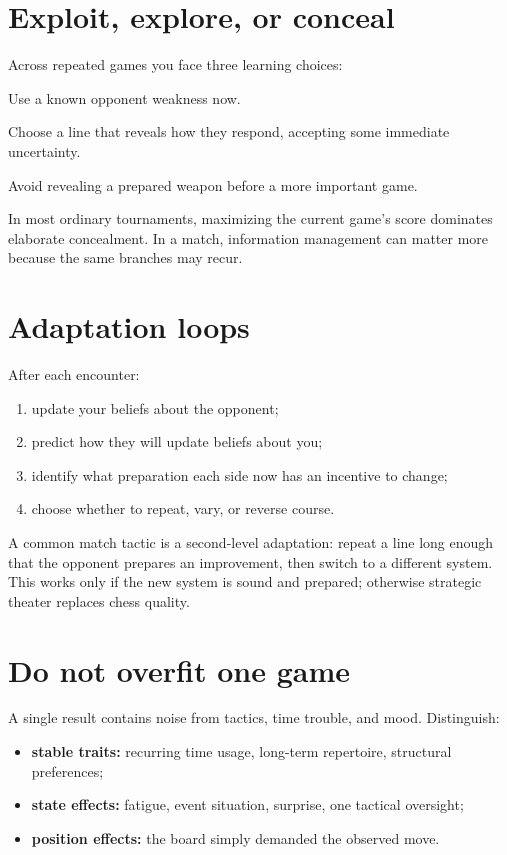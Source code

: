 \section{Exploit, explore, or conceal}
Across repeated games you face three learning choices:

\begin{description}[style=nextline,leftmargin=2.4em,labelsep=.5em]
\item[Exploit.] Use a known opponent weakness now.
\item[Explore.] Choose a line that reveals how they respond, accepting some immediate uncertainty.
\item[Conceal.] Avoid revealing a prepared weapon before a more important game.
\end{description}

In most ordinary tournaments, maximizing the current game's score dominates elaborate concealment. In a match, information management can matter more because the same branches may recur.

\section{Adaptation loops}
After each encounter:

\begin{enumerate}[leftmargin=1.4em]
\item update your beliefs about the opponent;
\item predict how they will update beliefs about you;
\item identify what preparation each side now has an incentive to change;
\item choose whether to repeat, vary, or reverse course.
\end{enumerate}

A common match tactic is a second-level adaptation: repeat a line long enough that the opponent prepares an improvement, then switch to a different system. This works only if the new system is sound and prepared; otherwise strategic theater replaces chess quality.

\section{Do not overfit one game}
A single result contains noise from tactics, time trouble, and mood. Distinguish:

\begin{itemize}[leftmargin=1.4em]
\item \textbf{stable traits:} recurring time usage, long-term repertoire, structural preferences;
\item \textbf{state effects:} fatigue, event situation, surprise, one tactical oversight;
\item \textbf{position effects:} the board simply demanded the observed move.
\end{itemize}

